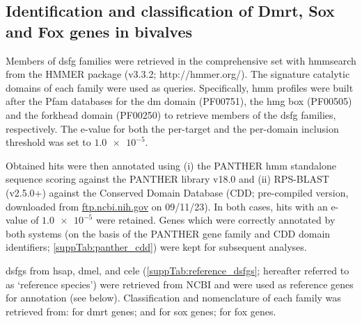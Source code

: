 \subsection{Identification and classification of Dmrt, Sox and Fox genes in bivalves}
Members of \gls{dsfg} families were retrieved in the comprehensive set with hmmsearch from the HMMER package (v3.3.2; http://hmmer.org/). The signature catalytic domains of each family were used as queries. Specifically, \gls{hmm} profiles were built after the Pfam databases for the \gls{dm} domain (PF00751), the \gls{hmg} box (PF00505) and the forkhead domain (PF00250) to retrieve members of the \gls{dsfg} families, respectively. The e-value for both the per-target and the per-domain inclusion threshold was set to $\num{1.0e-5}$.

Obtained hits were then annotated using (i) the PANTHER \gls{hmm} standalone sequence scoring against the PANTHER library v18.0 and (ii) RPS-BLAST (v2.5.0+) against the Conserved Domain Database (CDD; pre-compiled version, downloaded from \href{https://ftp.ncbi.nih.gov/pub/mmdb/cdd/little_endian/}{ftp.ncbi.nih.gov} on 09/11/23). In both cases, hits with an e-value of $\num{1.0e-5}$ were retained. Genes which were correctly annotated by both systems (on the basis of the PANTHER gene family and CDD domain identifiers; \cref{suppTab:panther_cdd}) were kept for subsequent analyses.

\glspl{dsfg} from \gls{hsap}, \gls{dmel}, and \gls{cele} (\cref{suppTab:reference_dsfgs}; hereafter referred to as ‘reference species’) were retrieved from NCBI and were used as reference genes for annotation (see below). Classification and nomenclature of each family was retrieved from:  for \gls{dmrt} genes;  and  for \gls{sox} genes;  for \gls{fox} genes.

